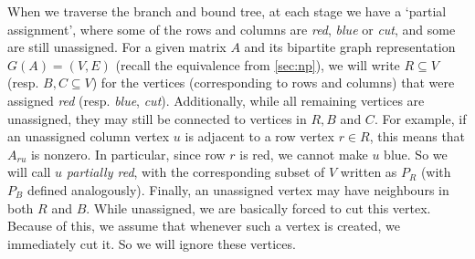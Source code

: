	When we traverse the branch and bound tree, at each stage we have a
	`partial assignment', where some of the rows and columns are
	\textit{red}, \textit{blue} or \textit{cut}, and some are still
	unassigned. For a given matrix $A$ and its bipartite graph representation
	$G(A) = (V, E)$ (recall the equivalence from \autoref{sec:np}),
	we will write $R \subseteq V$ (resp. $B, C \subseteq V$)
	for the vertices (corresponding to rows and columns) that were assigned
	\textit{red} (resp. \textit{blue}, \textit{cut}). Additionally, while
	all remaining vertices are unassigned, they may still be connected to
	vertices in $R, B$ and $C$. For example, if an unassigned column
	vertex $u$ is
	adjacent to a row vertex $r \in R$, this means that $A_{ru}$ is nonzero.
	In particular, since row $r$ is red, we cannot make $u$ blue. So we will
	call $u$ \textit{partially red}, with the corresponding subset of $V$
	written as $P_R$ (with $P_B$ defined
	analogously). Finally, an unassigned vertex may have neighbours in both
	$R$ and $B$. While unassigned, we are basically forced to cut this vertex.
	Because of this, we assume that whenever such a vertex is created, we
	immediately cut it. So we will ignore these vertices.

